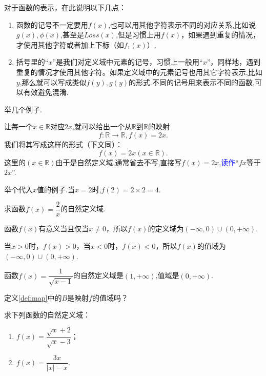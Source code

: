 \documentclass[lang=cn,math=cm,chinesefont=nofont,11pt,scheme=chinese,twocol]{elegantbook}
\begin{document}
对于函数的表示，在此说明以下几点：
\begin{enumerate}
  \item 函数的记号不一定要用$f(x)$,也可以用其他字符表示不同的对应关系,比如说$g(x),\phi (x)$,甚至是$Loss(x)$,但是习惯上用$f(x)$，如果遇到重复的情况，才使用其他字符或者加上下标（如$f_1(x)$）.
  \item 括号里的“$x$”是我们对定义域中元素的记号，习惯上一般用“$x$”，同样地，遇到重复的情况才使用其他字符。如果定义域中的元素记号也用其它字符表示,比如$y$,那么就可以写成类似$f(y),g(y)$的形式.不同的记号用来表示不同的函数,可以有效避免混淆.
\end{enumerate}

举几个例子.

\begin{example}\label{MapExample2}
  让每一个$x\in\mathbb{R}$对应$2x$,就可以给出一个从$\mathbb{R}$到$\mathbb{R}$的映射$$f:\mathbb{R}\rightarrow\mathbb{R},f(x)=2x.$$我们将其写成这样的形式（下文同）：$$f(x)=2x(x\in\mathbb{R}).$$这里的$(x\in\mathbb{R})$由于是自然定义域,通常省去不写,直接写$f(x)=2x$,\textcolor{blue}{读作}“$fx$等于$2x$”.

  举个代入$x$值的例子.当$x=2$时,$f(2)=2\times 2=4$.
\end{example}

\begin{spacing}{2.0}
  \begin{example}
    求函数$f(x)=\dfrac{2}{x}$的自然定义域.
  \end{example}

  \begin{solution}
    函数$f(x)$有意义当且仅当$x\neq 0$，所以$f(x)$的定义域为$(-\infty,0)\cup(0,+\infty)$.

    当$x>0$时，$f(x)>0$，当$x<0$时，$f(x)<0$，所以$f(x)$的值域为$(-\infty,0)\cup(0,+\infty)$.
  \end{solution}
  
  \begin{example}
    函数$f(x)=\dfrac{1}{\sqrt{x-1}}$的自然定义域是$(1,+\infty)$,值域是$(0,+\infty)$.
  \end{example}

  \begin{exercise}
    定义\ref{def:map}中的$B$是映射$f$的值域吗？
  \end{exercise}
  
  \begin{example}
    求下列函数的自然定义域：
  \end{example}
  
  \begin{enumerate}
    \item $f(x)=\dfrac{\sqrt{x}+2}{\sqrt{x}-3}$；
    \item $f(x)=\dfrac{3x}{\left| x \right|-x}$.
  \end{enumerate}
\end{spacing}
\end{document}
